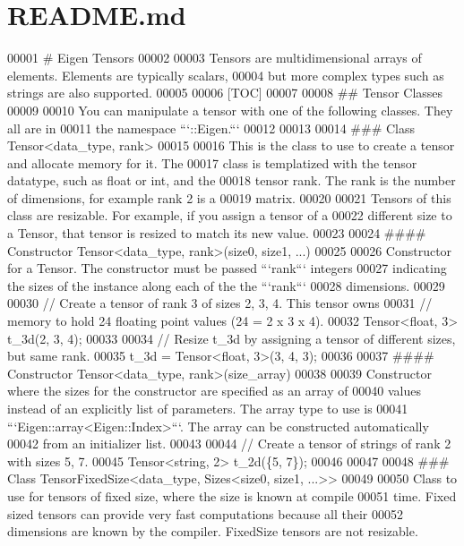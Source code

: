 \hypertarget{eigen_2unsupported_2_eigen_2_c_x_x11_2src_2_tensor_2_r_e_a_d_m_e_8md_source}{}\section{R\+E\+A\+D\+M\+E.\+md}

\begin{DoxyCode}
00001 # Eigen Tensors
00002 
00003 Tensors are multidimensional arrays of elements. Elements are typically scalars,
00004 but more complex types such as strings are also supported.
00005 
00006 [TOC]
00007 
00008 ## Tensor Classes
00009 
00010 You can manipulate a tensor with one of the following classes.  They all are in
00011 the namespace ```::Eigen.```
00012 
00013 
00014 ### Class Tensor<data\_type, rank>
00015 
00016 This is the class to use to create a tensor and allocate memory for it.  The
00017 class is templatized with the tensor datatype, such as float or int, and the
00018 tensor rank.  The rank is the number of dimensions, for example rank 2 is a
00019 matrix.
00020 
00021 Tensors of this class are resizable.  For example, if you assign a tensor of a
00022 different size to a Tensor, that tensor is resized to match its new value.
00023 
00024 #### Constructor Tensor<data\_type, rank>(size0, size1, ...)
00025 
00026 Constructor for a Tensor.  The constructor must be passed ```rank``` integers
00027 indicating the sizes of the instance along each of the the ```rank```
00028 dimensions.
00029 
00030     // Create a tensor of rank 3 of sizes 2, 3, 4.  This tensor owns
00031     // memory to hold 24 floating point values (24 = 2 x 3 x 4).
00032     Tensor<float, 3> t\_3d(2, 3, 4);
00033 
00034     // Resize t\_3d by assigning a tensor of different sizes, but same rank.
00035     t\_3d = Tensor<float, 3>(3, 4, 3);
00036 
00037 #### Constructor Tensor<data\_type, rank>(size\_array)
00038 
00039 Constructor where the sizes for the constructor are specified as an array of
00040 values instead of an explicitly list of parameters.  The array type to use is
00041 ```Eigen::array<Eigen::Index>```.  The array can be constructed automatically
00042 from an initializer list.
00043 
00044     // Create a tensor of strings of rank 2 with sizes 5, 7.
00045     Tensor<string, 2> t\_2d(\{5, 7\});
00046 
00047 
00048 ### Class TensorFixedSize<data\_type, Sizes<size0, size1, ...>>
00049 
00050 Class to use for tensors of fixed size, where the size is known at compile
00051 time.  Fixed sized tensors can provide very fast computations because all their
00052 dimensions are known by the compiler.  FixedSize tensors are not resizable.

\end{DoxyCode}

